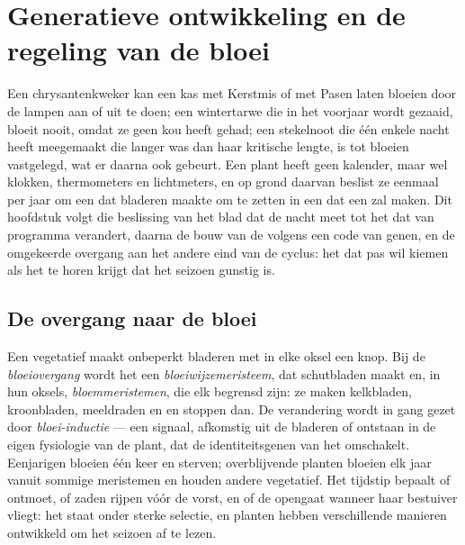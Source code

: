 \chapter{Generatieve ontwikkeling en de regeling van de bloei}\label{ch:b2:plant-flowering}

Een chrysantenkweker kan een kas met Kerstmis of met Pasen laten bloeien
door de lampen aan of uit te doen; een wintertarwe die in het voorjaar wordt
gezaaid, bloeit nooit, omdat ze geen kou heeft gehad; een stekelnoot die één
enkele nacht heeft meegemaakt die langer was dan haar kritische lengte, is
tot bloeien vastgelegd, wat er daarna ook gebeurt. Een plant heeft geen
kalender, maar wel klokken, thermometers en lichtmeters, en op grond daarvan
beslist ze eenmaal per jaar om een  dat bladeren maakte om te
zetten in een  dat een  zal maken. Dit hoofdstuk volgt die
beslissing van het blad dat de nacht meet tot het  dat van
programma verandert, daarna de bouw van de  volgens een code van
genen, en de omgekeerde overgang aan het andere eind van de cyclus: het 
dat pas wil kiemen als het te horen krijgt dat het seizoen gunstig is.

\section{De overgang naar de bloei}

\begin{definition}\label{def:b2:plant-flowering:transition}
Een vegetatief  maakt onbeperkt bladeren met in elke
oksel een knop. Bij de \emph{bloeiovergang} wordt het een
\emph{bloeiwijzemeristeem}, dat schutbladen maakt en, in hun oksels,
\emph{bloemmeristemen}, die elk begrensd zijn: ze maken kelkbladen,
kroonbladen, meeldraden en  en stoppen dan. De verandering
wordt in gang gezet door \emph{bloei-inductie} --- een signaal, afkomstig
uit de bladeren of ontstaan in de eigen fysiologie van de plant, dat de
identiteitsgenen van het  omschakelt. Eenjarigen bloeien één keer
en sterven; overblijvende planten bloeien elk jaar vanuit sommige
meristemen en houden andere vegetatief. Het tijdstip bepaalt of 
 ontmoet, of zaden rijpen vóór de vorst, en of de  opengaat
wanneer haar bestuiver vliegt: het staat onder sterke selectie, en planten
hebben verschillende manieren ontwikkeld om het seizoen af te lezen.
\end{definition}


